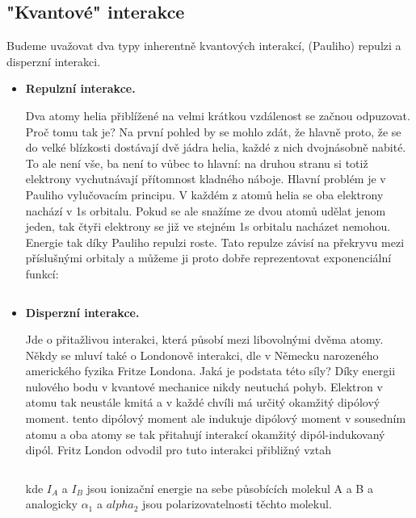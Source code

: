 \subsection{"Kvantové" interakce}   

Budeme uvažovat dva typy inherentně kvantových interakcí, (Pauliho) repulzi a disperzní interakci.

\begin{itemize} 

\item \textbf{Repulzní interakce.} 

Dva atomy helia přiblížené na velmi krátkou vzdálenost se začnou odpuzovat. Proč tomu tak je? Na první pohled by se mohlo zdát, že hlavně proto, že se do velké blízkosti dostávají dvě jádra helia, každé z nich dvojnásobně nabité. To ale není vše, ba není to vůbec to hlavní: na druhou stranu si totiž elektrony vychutnávají přítomnost kladného náboje. Hlavní problém je v Pauliho vylučovacím principu. V každém z atomů helia se oba elektrony nachází v 1s orbitalu. Pokud se ale snažíme  ze dvou atomů udělat jenom jeden, tak čtyři elektrony se již ve stejném 1s orbitalu nacházet nemohou. Energie tak díky Pauliho repulzi roste. Tato repulze závisí na překryvu mezi příslušnými orbitaly a můžeme ji proto dobře reprezentovat exponenciální funkcí:        
   

\begin{equation}
\label{rov:XXX}
\end{equation}


\item \textbf{Disperzní interakce.} 

Jde o přitažlivou interakci, která působí mezi libovolnými dvěma atomy. Někdy se mluví také o Londonově interakci, dle v Německu narozeného amerického fyzika Fritze Londona. Jaká je podstata této síly? Díky energii nulového bodu v kvantové mechanice nikdy neutuchá pohyb. Elektron v atomu tak neustále kmitá a v každé chvíli má určitý okamžitý dipólový moment. tento dipólový moment ale indukuje dipólový moment v sousedním atomu a oba atomy se tak přitahují interakcí okamžitý dipól-indukovaný dipól. Fritz London odvodil pro tuto interakci přibližný vztah

\begin{equation}
\label{rov:XXX}
\end{equation}

\noindent 
kde $I_A$ a $I_B$ jsou ionizační energie na sebe působících molekul A a B a analogicky $\alpha_1$ a $alpha_2$ jsou polarizovatelnosti těchto molekul.  
\end{itemize}

